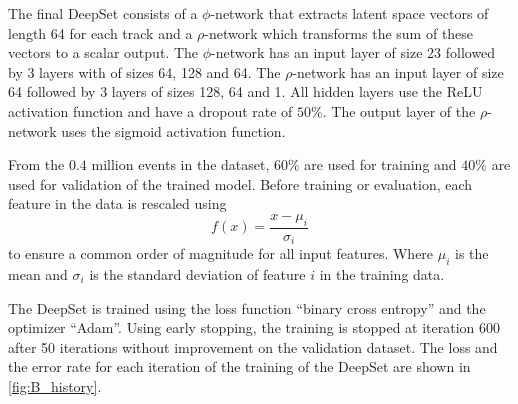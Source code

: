 The final DeepSet consists of a $\phi$-network that extracts latent space vectors of length 64 for each track and a $\rho$-network which transforms the sum of these vectors to a scalar output.
The $\phi$-network has an input layer of size 23 followed by 3 layers with of sizes 64, 128 and 64.
The $\rho$-network has an input layer of size 64 followed by 3 layers of sizes 128, 64 and 1.
All hidden layers use the ReLU activation function and have a dropout rate of $50\%$.
The output layer of the $\rho$-network uses the sigmoid activation function.

From the $0.4$ million events in the dataset, $60\%$ are used for training and $40\%$ are used for validation of the trained model.
Before training or evaluation, each feature in the data is rescaled using 
\begin{equation}
    f(x) = \frac{x - \mu_i}{\sigma_i} 
\end{equation} 
to ensure a common order of magnitude for all input features.
Where $\mu_i$ is the mean and $\sigma_i$ is the standard deviation of feature $i$ in the training data.

The DeepSet is trained using the loss function \enquote{binary cross entropy} and the optimizer \enquote{Adam}.
Using early stopping, the training is stopped at iteration 600 after 50 iterations without improvement on the validation dataset.
The loss and the error rate for each iteration of the training of the DeepSet are shown in \cref{fig:B_history}.

